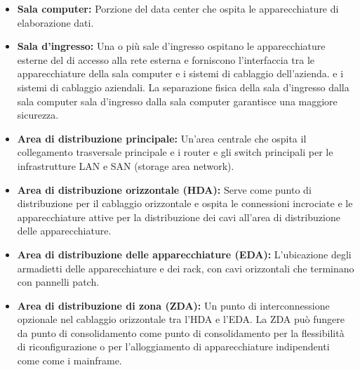 \begin{itemize}
    \item \textbf{Sala computer:} Porzione del data center che ospita le apparecchiature di elaborazione dati.
    
    \item \textbf{Sala d'ingresso:} Una o più sale d'ingresso ospitano le apparecchiature esterne del di accesso alla rete esterna e forniscono l'interfaccia tra le apparecchiature della sala computer e i sistemi di cablaggio dell'azienda. e i sistemi di cablaggio aziendali. La separazione fisica della sala d'ingresso dalla sala computer sala d'ingresso dalla sala computer garantisce una maggiore sicurezza.
    
    \item \textbf{Area di distribuzione principale:} Un'area centrale che ospita il collegamento trasversale principale e i router e gli switch principali per le infrastrutture LAN e SAN (storage area network).
    
    \item \textbf{Area di distribuzione orizzontale (HDA):} Serve come punto di distribuzione per il cablaggio orizzontale e ospita le connessioni incrociate e le apparecchiature attive per la distribuzione dei cavi all'area di distribuzione delle apparecchiature.
    
    \item \textbf{Area di distribuzione delle apparecchiature (EDA):} L'ubicazione degli armadietti delle apparecchiature e dei rack, con cavi orizzontali che terminano con pannelli patch.
    
    \item \textbf{Area di distribuzione di zona (ZDA):} Un punto di interconnessione opzionale nel cablaggio orizzontale tra l'HDA e l'EDA. La ZDA può fungere da punto di consolidamento come punto di consolidamento per la flessibilità di riconfigurazione o per l'alloggiamento di apparecchiature indipendenti come come i mainframe.
\end{itemize}
